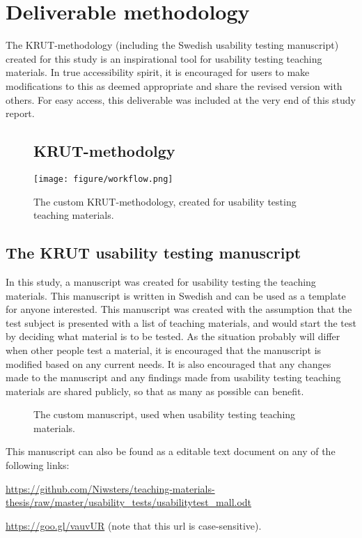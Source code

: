\chapter{Deliverable methodology}
The KRUT-methodology (including the Swedish usability testing manuscript) created for this study is an inspirational tool for usability testing teaching materials. In true accessibility spirit, it is encouraged for users to make modifications to this as deemed appropriate and share the revised version with others. For easy access, this deliverable was included at the very end of this study report. 

\mbox{}
\begin{sidewaysfigure}
\section{KRUT-methodolgy}
\texttt{[image: figure/workflow.png]}
\vspace*{2cm}
\caption{The custom KRUT-methodology, created for usability testing teaching materials.}
\label{app:krut}
\end{sidewaysfigure}

\newpage
\section{The KRUT usability testing manuscript} \label{krutscript}
In this study, a manuscript was created for usability testing the teaching materials. This manuscript is written in Swedish and can be used as a template for anyone interested. This manuscript was created with the assumption that the test subject is presented with a list of teaching materials, and would start the test by deciding what material is to be tested. As the situation probably will differ when other people test a material, it is encouraged that the manuscript is modified based on any current needs. It is also encouraged that any changes made to the manuscript and any findings made from usability testing teaching materials are shared publicly, so that as many as possible can benefit.

\begin{figure}[h]
\caption{The custom manuscript, used when usability testing teaching materials.}
\label{app:script}
\end{figure}

This manuscript can also be found as a editable text document on any of the following links:

\url{https://github.com/Niwsters/teaching-materials-thesis/raw/master/usability_tests/usabilitytest_mall.odt}

\url{https://goo.gl/vauvUR} (note that this url is case-sensitive).
